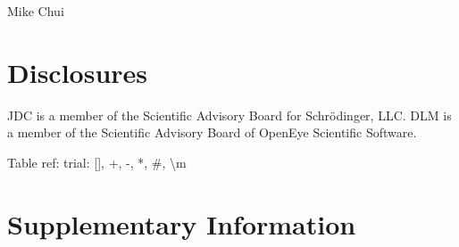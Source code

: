 \documentclass[9pt,lineno,final]{elife}
\newcommand{\beginsupplement}{%
        \setcounter{table}{0}
        \renewcommand{\thetable}{S\arabic{table}}%
        \setcounter{figure}{0}
        \renewcommand{\thefigure}{S\arabic{figure}}%
     }
\begin{document}
Mike Chui

\section{Disclosures}

JDC is a member of the Scientific Advisory Board for Schr\"{o}dinger, LLC.
DLM is a member of the Scientific Advisory Board of OpenEye Scientific Software.

Table ref: \cite{ACD-pKa-galas, ACD-pKa-classic, simulation-plus-pKa, chemicalize-pKa, moka-pKa}
trial: [], +, -, *, \#, \textbackslash{}m






\newpage
\beginsupplement
\section{Supplementary Information}
\end{document}
